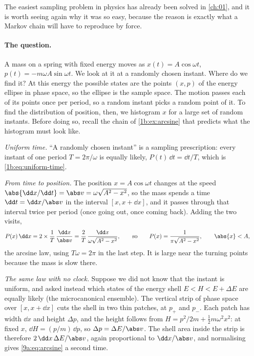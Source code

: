 The easiest sampling problem in physics has already been solved in \cref{ch:01}, and it is
worth seeing again why it was so easy, because the reason is exactly what a Markov chain will
have to reproduce by force.

\paragraph{The question.}
A mass on a spring with fixed energy moves as $x(t)=A\cos\omega t$, $p(t)=-m\omega
A\sin\omega t$. We look at it at a randomly chosen instant. Where do we find it?
At this energy the possible states are the points $(x,p)$ of the energy ellipse in phase
space, so the ellipse is the sample space. The motion passes each of its points once per
period, so a random instant picks a random point of it. To find the distribution of position,
then, we histogram $x$ for a large set of random instants. Before doing so, recall the chain
of \cref{1b:ex:arcsine} that predicts what the histogram must look like.

\emph{Uniform time.} ``A randomly chosen instant'' is a sampling prescription: every instant
of one period $T=2\pi/\omega$ is equally likely, $P(t)\,\dd t=\dd t/T$, which is
\eqref{1b:eq:uniform-time}.

\emph{From time to position.} The position $x=A\cos\omega t$ changes at the speed
$\abs{\dd x/\dd t}=\abs v=\omega\sqrt{A^2-x^2}$, so the mass spends a time $\dd t=\dd x/\abs v$
in the interval $[x,x+\dd x]$, and it passes through that interval twice per period (once
going out, once coming back). Adding the two visits,
\begin{equation}
  P(x)\,\dd x=2\times\frac1T\,\frac{\dd x}{\abs v}=\frac{2}{T}\,\frac{\dd x}{\omega\sqrt{A^2-x^2}},
  \qquad\text{so}\qquad
  P(x)=\frac{1}{\pi\sqrt{A^2-x^2}},\qquad \abs{x}<A,
  \label{9a:eq:arcsine}
\end{equation}
the arcsine law, using $T\omega=2\pi$ in the last step. It is large near the turning points
because the mass is slow there.

\emph{The same law with no clock.} Suppose we did not know that the instant is uniform, and
asked instead which states of the energy shell $E<H<E+\Delta E$ are equally likely (the
microcanonical ensemble). The vertical strip of phase space over $[x,x+\dd x]$ cuts the shell
in two thin patches, at $p_+$ and $p_-$. Each patch has width $\dd x$ and height $\Delta p$,
and the height follows from $H=p^2/2m+\tfrac12m\omega^2x^2$: at fixed $x$, $\dd H=(p/m)\,\dd p$,
so $\Delta p=\Delta E/\abs v$. The shell area inside the strip is therefore
$2\,\dd x\,\Delta E/\abs v$, again proportional to $\dd x/\abs v$, and normalising gives
\eqref{9a:eq:arcsine} a second time.

